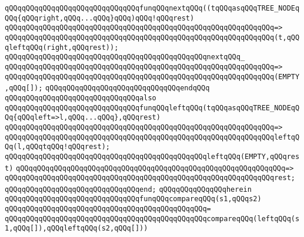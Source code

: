 \newline
\verb|qQQqqQQqqQQqqQQqqQQqqQQqqQQqqQQqfunqQQqnextqQQq((tqQQqasqQQqTREE_NODEqQQq{qQQqright,qQQq...qQQq}qQQq)qQQq!qQQqrest)|\newline
\verb|qQQqqQQqqQQqqQQqqQQqqQQqqQQqqQQqqQQqqQQqqQQqqQQqqQQqqQQqqQQqqQQq=>|\newline
\verb|qQQqqQQqqQQqqQQqqQQqqQQqqQQqqQQqqQQqqQQqqQQqqQQqqQQqqQQqqQQqqQQq(t,qQQqleftqQQq(right,qQQqrest));|\newline
\newline
\verb|qQQqqQQqqQQqqQQqqQQqqQQqqQQqqQQqqQQqqQQqqQQqqQQqnextqQQq_|\newline
\verb|qQQqqQQqqQQqqQQqqQQqqQQqqQQqqQQqqQQqqQQqqQQqqQQqqQQqqQQqqQQqqQQq=>|\newline
\verb|qQQqqQQqqQQqqQQqqQQqqQQqqQQqqQQqqQQqqQQqqQQqqQQqqQQqqQQqqQQqqQQq(EMPTY,qQQq[]);|\newline
\verb|qQQqqQQqqQQqqQQqqQQqqQQqqQQqqQQqendqQQq|\newline
\newline
\verb|qQQqqQQqqQQqqQQqqQQqqQQqqQQqqQQqalso|\newline
\verb|qQQqqQQqqQQqqQQqqQQqqQQqqQQqqQQqfunqQQqleftqQQq(tqQQqasqQQqTREE_NODEqQQq{qQQqleft=>l,qQQq...qQQq},qQQqrest)|\newline
\verb|qQQqqQQqqQQqqQQqqQQqqQQqqQQqqQQqqQQqqQQqqQQqqQQqqQQqqQQqqQQqqQQq=>|\newline
\verb|qQQqqQQqqQQqqQQqqQQqqQQqqQQqqQQqqQQqqQQqqQQqqQQqqQQqqQQqqQQqqQQqleftqQQq(l,qQQqtqQQq!qQQqrest);|\newline
\newline
\verb|qQQqqQQqqQQqqQQqqQQqqQQqqQQqqQQqqQQqqQQqqQQqqQQqleftqQQq(EMPTY,qQQqrest)|\newline
\verb|qQQqqQQqqQQqqQQqqQQqqQQqqQQqqQQqqQQqqQQqqQQqqQQqqQQqqQQqqQQqqQQq=>|\newline
\verb|qQQqqQQqqQQqqQQqqQQqqQQqqQQqqQQqqQQqqQQqqQQqqQQqqQQqqQQqqQQqqQQqrest;|\newline
\verb|qQQqqQQqqQQqqQQqqQQqqQQqqQQqqQQqend;|\newline
\newline
\verb|qQQqqQQqqQQqqQQqherein|\newline
\newline
\verb|qQQqqQQqqQQqqQQqqQQqqQQqqQQqqQQqfunqQQqcompareqQQq(s1,qQQqs2)|\newline
\verb|qQQqqQQqqQQqqQQqqQQqqQQqqQQqqQQqqQQqqQQqqQQqqQQq=|\newline
\verb|qQQqqQQqqQQqqQQqqQQqqQQqqQQqqQQqqQQqqQQqqQQqqQQqcompareqQQq(leftqQQq(s1,qQQq[]),qQQqleftqQQq(s2,qQQq[]))|\newline
